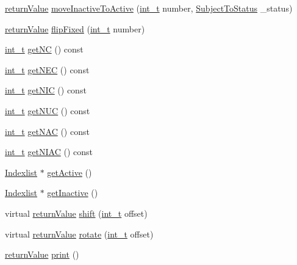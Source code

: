 \begin{DoxyCompactItemize}
\item 
\hyperlink{_message_handling_8hpp_a81d556f613bfbabd0b1f9488c0fa865e}{return\+Value} \hyperlink{class_constraints_a14d3a95b65c59f935ac8967265aa71a9}{move\+Inactive\+To\+Active} (\hyperlink{_types_8hpp_ab6fd6105e64ed14a0c9281326f05e623}{int\+\_\+t} number, \hyperlink{_types_8hpp_a70a6a40d261a015ead8d43aa589383a4}{Subject\+To\+Status} \+\_\+status)
\item 
\hyperlink{_message_handling_8hpp_a81d556f613bfbabd0b1f9488c0fa865e}{return\+Value} \hyperlink{class_constraints_a2d92efd44ce48f4b4ac04c21c5fda6e6}{flip\+Fixed} (\hyperlink{_types_8hpp_ab6fd6105e64ed14a0c9281326f05e623}{int\+\_\+t} number)
\item 
\hyperlink{_types_8hpp_ab6fd6105e64ed14a0c9281326f05e623}{int\+\_\+t} \hyperlink{class_constraints_a448e9210dcbdc9a191914f4b7dc2759e}{get\+NC} () const
\item 
\hyperlink{_types_8hpp_ab6fd6105e64ed14a0c9281326f05e623}{int\+\_\+t} \hyperlink{class_constraints_add16d415a735969692ae1cd9606cb371}{get\+N\+EC} () const
\item 
\hyperlink{_types_8hpp_ab6fd6105e64ed14a0c9281326f05e623}{int\+\_\+t} \hyperlink{class_constraints_a9b3c5b78fb7b89cfdca2934522707984}{get\+N\+IC} () const
\item 
\hyperlink{_types_8hpp_ab6fd6105e64ed14a0c9281326f05e623}{int\+\_\+t} \hyperlink{class_constraints_a007ece0d52cfc75f429eb7d79f4c8f2a}{get\+N\+UC} () const
\item 
\hyperlink{_types_8hpp_ab6fd6105e64ed14a0c9281326f05e623}{int\+\_\+t} \hyperlink{class_constraints_a6a006b2ffc150038ef194172f097accf}{get\+N\+AC} () const
\item 
\hyperlink{_types_8hpp_ab6fd6105e64ed14a0c9281326f05e623}{int\+\_\+t} \hyperlink{class_constraints_a6839696f0f7796713028ece97ae00fd8}{get\+N\+I\+AC} () const
\item 
\hyperlink{class_indexlist}{Indexlist} $\ast$ \hyperlink{class_constraints_ad72b2d0ba9bf79297ed39642e2d18c77}{get\+Active} ()
\item 
\hyperlink{class_indexlist}{Indexlist} $\ast$ \hyperlink{class_constraints_a38d7f83123a7a277fde92bf493776a72}{get\+Inactive} ()
\item 
virtual \hyperlink{_message_handling_8hpp_a81d556f613bfbabd0b1f9488c0fa865e}{return\+Value} \hyperlink{class_constraints_a7605104071cb0396a8c426bfce82c49f}{shift} (\hyperlink{_types_8hpp_ab6fd6105e64ed14a0c9281326f05e623}{int\+\_\+t} offset)
\item 
virtual \hyperlink{_message_handling_8hpp_a81d556f613bfbabd0b1f9488c0fa865e}{return\+Value} \hyperlink{class_constraints_a13958ee91f93760c0cb9d5a47de846f2}{rotate} (\hyperlink{_types_8hpp_ab6fd6105e64ed14a0c9281326f05e623}{int\+\_\+t} offset)
\item 
\hyperlink{_message_handling_8hpp_a81d556f613bfbabd0b1f9488c0fa865e}{return\+Value} \hyperlink{class_constraints_abf7172e93fd13af99c76ec8f822b921e}{print} ()
\end{DoxyCompactItemize}
